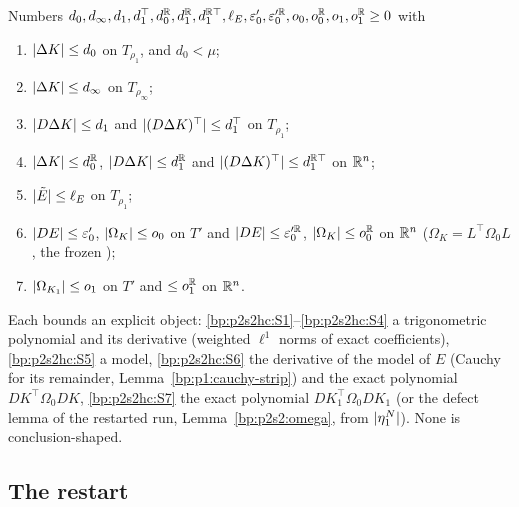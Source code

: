 \begin{definition}\label{bp:p2s2hc:bounds}
Numbers $d_0,d_\infty,d_1,d_1^\top,d_0^{\mathbb{R}},d_1^{\mathbb{R}},d_1^{\mathbb{R}\top},\ell_E,\varepsilon_0',\varepsilon_0'^{\mathbb{R}},o_0,o_0^{\mathbb{R}},o_1,o_1^{\mathbb{R}}\ge0$ with
\begin{enumerate}[label=(S\arabic*)]
\item\label{bp:p2s2hc:S1} $\lvert \Delta K\rvert\le d_0$ on $T_{\rho_1}$, and $d_0<\mu$;
\item\label{bp:p2s2hc:S2} $\lvert \Delta K\rvert\le d_\infty$ on $T_{\rho_\infty}$;
\item\label{bp:p2s2hc:S3} $\lvert D\Delta K\rvert\le d_1$ and $\lvert (D\Delta K)^\top\rvert\le d_1^\top$ on $T_{\rho_1}$;
\item\label{bp:p2s2hc:S4} $\lvert \Delta K\rvert\le d_0^{\mathbb{R}}$, $\lvert D\Delta K\rvert\le d_1^{\mathbb{R}}$ and $\lvert (D\Delta K)^\top\rvert\le d_1^{\mathbb{R}\top}$ on $\mathbb{R}^n$;
\item\label{bp:p2s2hc:S5} $\lvert \tilde E\rvert\le\ell_E$ on $T_{\rho_1}$;
\item\label{bp:p2s2hc:S6} $\lvert DE\rvert\le\varepsilon_0'$, $\lvert \Omega_K\rvert\le o_0$ on $T'$ and $\lvert DE\rvert\le\varepsilon_0'^{\mathbb{R}}$, $\lvert \Omega_K\rvert\le o_0^{\mathbb{R}}$ on $\mathbb{R}^n$
  ($\Omega_K=L^\top\Omega_0L$, the frozen );
\item\label{bp:p2s2hc:S7} $\lvert \Omega_{K_1}\rvert\le o_1$ on $T'$ and $\le o_1^{\mathbb{R}}$ on $\mathbb{R}^n$.
\end{enumerate}
Each bounds an explicit object: \ref{bp:p2s2hc:S1}--\ref{bp:p2s2hc:S4} a trigonometric polynomial and its derivative (weighted $\ell^1$ norms
of exact coefficients), \ref{bp:p2s2hc:S5} a model, \ref{bp:p2s2hc:S6} the derivative of the model of $E$ (Cauchy for its remainder,
Lemma~\ref{bp:p1:cauchy-strip}) and the exact polynomial $DK^\top\Omega_0DK$, \ref{bp:p2s2hc:S7} the exact polynomial $DK_1^\top\Omega_0DK_1$ (or
the defect lemma of the restarted run, Lemma~\ref{bp:p2s2:omega}, from $\lvert \eta^N_1\rvert$). None is conclusion-shaped.
\end{definition}

\subsection{The restart}\label{bp:p2s2hc:sec-restart}

